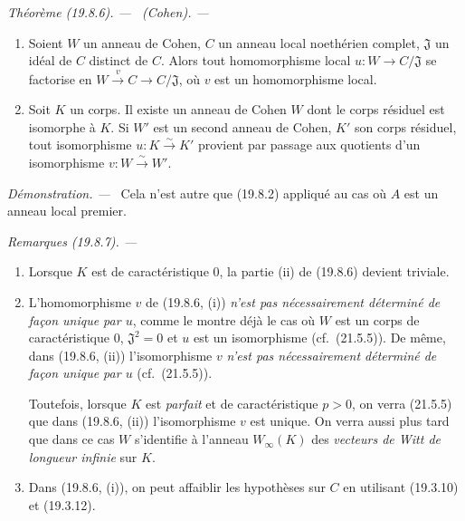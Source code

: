 \documentclass[10pt,oneside]{book}
\makeatletter
\newcommand{\setmanualcurrentlabel}[1]{\def\@currentlabel{#1}}
\newenvironment{theorem}[1][]{%
  \setmanualcurrentlabel{#1}\par\medskip\noindent\itshape Théorème (#1). ---\ }{\par}
\newenvironment{remarks}[1][]{%
  \setmanualcurrentlabel{#1}\par\medskip\noindent\itshape Remarques (#1). ---\ }{\par}
\newenvironment{proof}{%
  \par\medskip\noindent\textit{Démonstration. ---\ }}{\par}
\makeatother
\begin{document}
\begin{theorem}[19.8.6]
\label{0.19.8.6-fr}
\textup{(Cohen).} ---
\begin{enumerate}
  \item[(i)] Soient $W$ un anneau de Cohen, $C$ un anneau local noethérien
  complet, $\mathfrak J$ un idéal de $C$ distinct de $C$. Alors tout
  homomorphisme local $u:W\to C/\mathfrak J$ se factorise en
  $W\xrightarrow{v}C\to C/\mathfrak J$, où $v$ est un homomorphisme local.
  \item[(ii)] Soit $K$ un corps. Il existe un anneau de Cohen $W$ dont le corps
  résiduel est isomorphe à $K$. Si $W'$ est un second anneau de Cohen, $K'$ son
  corps résiduel, tout isomorphisme $u:K\xrightarrow{\sim}K'$ provient par
  passage aux quotients d'un isomorphisme $v:W\xrightarrow{\sim}W'$.
\end{enumerate}
\end{theorem}

\begin{proof}
Cela n'est autre que (19.8.2) appliqué au cas où $A$ est un anneau local
premier.
\end{proof}

\begin{remarks}[19.8.7]
\label{0.19.8.7-fr}
\begin{enumerate}
  \item[(i)] Lorsque $K$ est de caractéristique $0$, la partie (ii) de (19.8.6)
  devient triviale.
  \item[(ii)] L'homomorphisme $v$ de (19.8.6, (i)) \emph{n'est pas
  nécessairement déterminé de façon unique par $u$}, comme le montre déjà le
  cas où $W$ est un corps de caractéristique $0$, $\mathfrak J^2=0$ et $u$ est
  un isomorphisme (cf.~(21.5.5)). De même, dans (19.8.6, (ii)) l'isomorphisme
  $v$ \emph{n'est pas nécessairement déterminé de façon unique par $u$}
  (cf.~(21.5.5)).

  Toutefois, lorsque $K$ est \emph{parfait} et de caractéristique $p>0$, on
  verra (21.5.5) que dans (19.8.6, (ii)) l'isomorphisme $v$ est unique. On verra
  aussi plus tard que dans ce cas $W$ s'identifie à l'anneau $W_\infty(K)$ des
  \emph{vecteurs de Witt de longueur infinie} sur $K$.
  \item[(iii)] Dans (19.8.6, (i)), on peut affaiblir les hypothèses sur $C$ en
  utilisant (19.3.10) et (19.3.12).
\end{enumerate}
\end{remarks}
\end{document}
